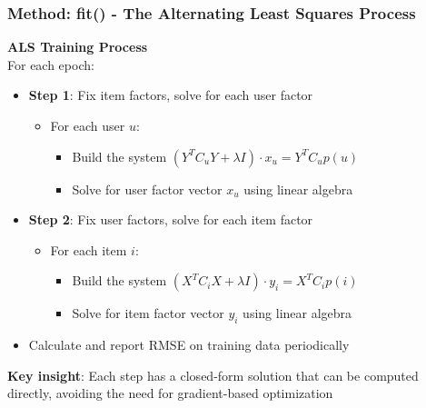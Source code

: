 \documentclass{beamer}
\begin{document}
\begin{frame}
\frametitle{Method: fit() - The Alternating Least Squares Process}
    \textbf{ALS Training Process}
    \\ For each epoch:
    \begin{itemize}
        \item \textbf{Step 1}: Fix item factors, solve for each user factor
        \begin{itemize}
            \item For each user $u$:
            \begin{itemize}
                \item Build the system $(Y^T C_u Y + \lambda I) \cdot x_u = Y^T C_u p(u)$
                \item Solve for user factor vector $x_u$ using linear algebra
            \end{itemize}
        \end{itemize}
        \item \textbf{Step 2}: Fix user factors, solve for each item factor
        \begin{itemize}
            \item For each item $i$:
            \begin{itemize}
                \item Build the system $(X^T C_i X + \lambda I) \cdot y_i = X^T C_i p(i)$
                \item Solve for item factor vector $y_i$ using linear algebra
            \end{itemize}
        \end{itemize}
        \item Calculate and report RMSE on training data periodically
    \end{itemize}
    
    \textbf{Key insight}: Each step has a closed-form solution that can be computed directly, avoiding the need for gradient-based optimization
\end{frame}
\end{document}

